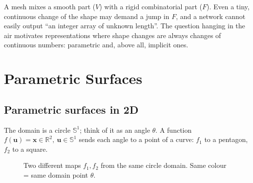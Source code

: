 \documentclass[11pt,a4paper]{article}
\newcommand{\R}{\mathbb{R}}
\newcommand{\Sph}{\mathbb{S}}
\newcommand{\vx}{\bm{x}}
\newcommand{\vu}{\bm{u}}
\theoremstyle{definition}
\theoremstyle{plain}
\theoremstyle{remark}
\begin{document}
\begin{intuition}
A mesh mixes a smooth part ($V$) with a rigid combinatorial part ($F$). Even a tiny, continuous change of the shape may demand a jump in $F$, and a network cannot easily output ``an integer array of unknown length''. The question hanging in the air motivates representations where shape changes are always changes of continuous numbers: parametric and, above all, implicit ones.
\end{intuition}

\section{Parametric Surfaces }

\subsection{Parametric surfaces in 2D }
The domain is a circle $\Sph^1$; think of it as an angle $\theta$. A function $f(\vu)=\vx\in\R^2,\ \vu\in\Sph^1$ sends each angle to a point of a curve: $f_1$ to a pentagon, $f_2$ to a square.

\begin{figure}[ht]
\centering
{}
\caption{Two different maps $f_1,f_2$ from the same circle domain. Same colour = same domain point $\theta$.}
\end{figure}
\end{document}
